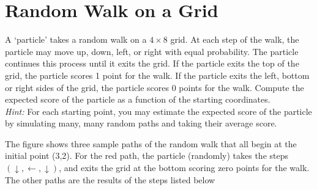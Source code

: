 \section{Random Walk on a Grid} 
A `particle' takes a random walk on a $4 \times 8$ grid. At each step of the walk, the particle may move up, down, left, or right with equal probability. The particle continues this process until it exits the grid. If the particle exits the top of the grid, the particle scores 1 point for the walk. If the particle exits the left, bottom or right sides of the grid, the particle scores 0 points for the walk. 
Compute the expected score of the particle as a function of the starting coordinates.\\

\noindent \textit{Hint:} For each starting point, you may estimate the expected score of the particle by simulating many, many random paths and taking their average score.\\
\begin{center}
\end{center}
The figure shows three sample paths of the random walk that all begin at the initial point (3,2). For the red path, the particle (randomly) takes the steps $(\downarrow, \leftarrow, \downarrow)$, and exits the grid at the bottom scoring zero points for the walk. The other paths are the results of the steps listed below
